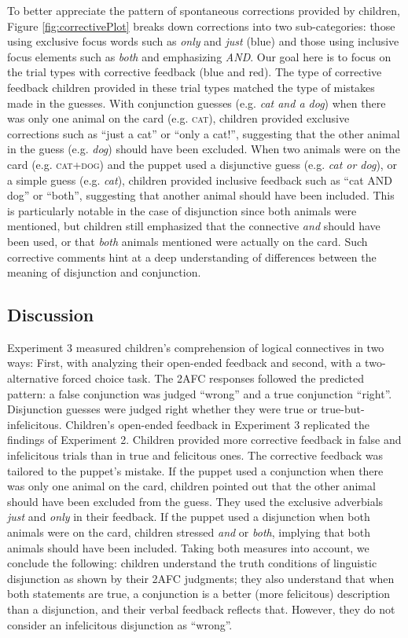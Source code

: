 \documentclass[,man,floatsintext]{apa6}
\begin{document}
To better appreciate the pattern of spontaneous corrections provided by children, Figure \ref{fig:correctivePlot} breaks down corrections into two sub-categories: those using exclusive focus words such as \emph{only} and \emph{just} (blue) and those using inclusive focus elements such as \emph{both} and emphasizing \emph{AND}. Our goal here is to focus on the trial types with corrective feedback (blue and red). The type of corrective feedback children provided in these trial types matched the type of mistakes made in the guesses. With conjunction guesses (e.g. \emph{cat and a dog}) when there was only one animal on the card (e.g. \textsc{cat}), children provided exclusive corrections such as \enquote{just a cat} or \enquote{only a cat!}, suggesting that the other animal in the guess (e.g. \emph{dog}) should have been excluded. When two animals were on the card (e.g. \textsc{cat+dog}) and the puppet used a disjunctive guess (e.g. \emph{cat or dog}), or a simple guess (e.g. \emph{cat}), children provided inclusive feedback such as \enquote{cat AND dog} or \enquote{both}, suggesting that another animal should have been included. This is particularly notable in the case of disjunction since both animals were mentioned, but children still emphasized that the connective \emph{and} should have been used, or that \emph{both} animals mentioned were actually on the card. Such corrective comments hint at a deep understanding of differences between the meaning of disjunction and conjunction.

\hypertarget{discussion-2}{%
\subsection{Discussion}\label{discussion-2}}

Experiment 3 measured children's comprehension of logical connectives in two ways: First, with analyzing their open-ended feedback and second, with a two-alternative forced choice task. The 2AFC responses followed the predicted pattern: a false conjunction was judged \enquote{wrong} and a true conjunction \enquote{right}. Disjunction guesses were judged right whether they were true or true-but-infelicitous. Children's open-ended feedback in Experiment 3 replicated the findings of Experiment 2. Children provided more corrective feedback in false and infelicitous trials than in true and felicitous ones. The corrective feedback was tailored to the puppet's mistake. If the puppet used a conjunction when there was only one animal on the card, children pointed out that the other animal should have been excluded from the guess. They used the exclusive adverbials \emph{just} and \emph{only} in their feedback. If the puppet used a disjunction when both animals were on the card, children stressed \emph{and} or \emph{both}, implying that both animals should have been included. Taking both measures into account, we conclude the following: children understand the truth conditions of linguistic disjunction as shown by their 2AFC judgments; they also understand that when both statements are true, a conjunction is a better (more felicitous) description than a disjunction, and their verbal feedback reflects that. However, they do not consider an infelicitous disjunction as \enquote{wrong}.
\end{document}
